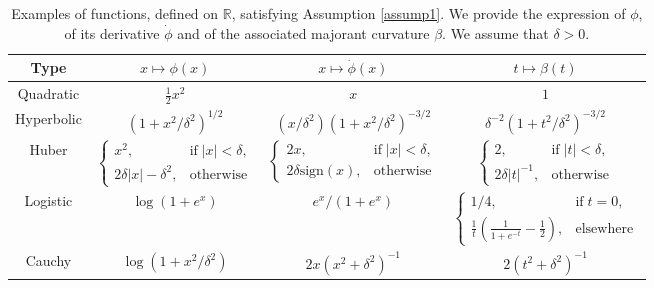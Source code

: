 \documentclass[review]{elsarticle}
\begin{document}
\begin{table}
\renewcommand*{\arraystretch}{1.5}
\centering
\begin{tabular}{|c||c|c|c|}
\hline
{Type} & $x \mapsto \phi(x)$ & $x \mapsto\dot{\phi}(x)$ & $t \mapsto \beta(t)$ \\
\hline
\hline
Quadratic & $\frac{1}{2} x^2$ & $x $ & $1$\\
\hline
Hyperbolic & $(1 + x^2/\delta^2)^{1/2}$ & $(x/\delta^2) (1 + x^2/\delta^2)^{-3/2}$ & $\delta^{-2} (1 + t^2/\delta^2)^{-3/2}$\\
\hline                           
Huber & $\begin{cases} x^2, & \text{if} \;|x|<\delta,\\ 2 \delta |x|- \delta^2, & \text{otherwise} \end{cases}$ & 
$\begin{cases} 2x, & \text{if} \;|x|<\delta,\\ 2 \delta \text{sign}(x), & \text{otherwise}  \end{cases}$ & 
$\begin{cases} 2, & \text{if} \;|t|<\delta,\\ 2 \delta |t|^{-1}, & \text{otherwise}  \end{cases}$\\
\hline                                                                
Logistic & $\log( 1 + e^x)$ & $e^x / (1 + e^x)$ & $\begin{cases} 1/4, & \text{if} \; t = 0,\\ \frac{1}{t}(\frac{1}{1 + e^{-t}}-\frac{1}{2}), & \text{elsewhere} \end{cases} $\\
\hline
Cauchy & $\log(1 + x^2/\delta^2)$ & $2 x  (x^2 + \delta^2)^{-1}$ & $2 (t^2 + \delta^2)^{-1}$\\
\hline
\end{tabular}
\caption{Examples of functions, defined on $\mathbb{R}$, satisfying Assumption \ref{assump1}. We provide the expression of $\phi$, of its derivative $\dot{\phi}$ and of the associated majorant curvature $\beta$. We assume that $\delta>0$.}
\label{tab:Assumption1}
\end{table}
\end{document}
